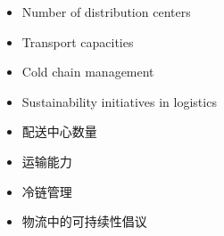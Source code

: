 \begin{itemize}
    \item Number of distribution centers
    \item Transport capacities
    \item Cold chain management
    \item Sustainability initiatives in logistics
\end{itemize}

\begin{itemize}
    \item 配送中心数量
    \item 运输能力
    \item 冷链管理
    \item 物流中的可持续性倡议
\end{itemize}
